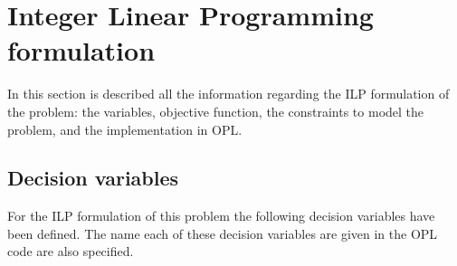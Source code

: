 
\section{Integer Linear Programming formulation}

In this section is described all the information regarding the ILP formulation of the problem: the
variables, objective function, the constraints to model the problem, and the implementation in OPL.

\subsection{Decision variables}

For the ILP formulation of this problem the following decision variables have been defined. The name
each of these decision variables are given in the OPL code are also specified.

